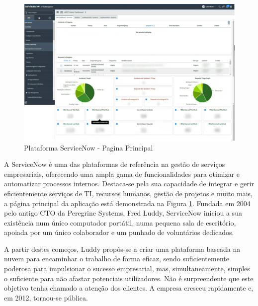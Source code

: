             \begin{figure}[htbp]
                \centering
                \includegraphics[width=\textwidth]{imgs/ServiceNow.png} %
                \caption[Plataforma ServiceNow - Pagina Principal]{Plataforma ServiceNow - Pagina Principal\protect\footnotemark}\label{fig:service-ui}
            \end{figure}

            A ServiceNow é uma das plataformas de referência na gestão de serviços empresariais, oferecendo uma ampla gama de funcionalidades para otimizar e automatizar processos internos. Destaca-se pela sua capacidade de integrar e gerir eficientemente serviços de TI, recursos humanos, gestão de projetos e muito mais, a página principal da aplicação está demonstrada na Figura \ref{fig:service-ui}. Fundada em 2004 pelo antigo CTO da Peregrine Systems, Fred Luddy, ServiceNow iniciou a sua existência num único computador portátil, numa pequena sala de escritório, apoiada por um único colaborador e um punhado de voluntários dedicados.

            A partir destes começos, Luddy propôs-se a criar uma plataforma baseada na nuvem para encaminhar o trabalho de forma eficaz, sendo suficientemente poderosa para impulsionar o sucesso empresarial, mas, simultaneamente, simples o suficiente para não afastar potenciais utilizadores. Não é surpreendente que este objetivo tenha chamado a atenção dos clientes. A empresa cresceu rapidamente e, em 2012, tornou-se pública.
            
